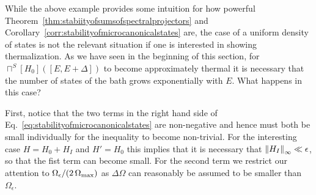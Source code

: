 \documentclass[a4paper,12pt,listof=totoc,index=totoc,bibliography=totoc,headsepline=false,headings=normal,BCOR16.153846mm,DIV12,headinclude,twoside,cleardoublepage=empty,numbers=noenddot,final]{scrreprt}
\theoremstyle{mystyle}
\numberwithin{equation}{section}
\numberwithin{figure}{section}
\numberwithin{lemma}{section}
\numberwithin{theorem}{section}
\numberwithin{corollary}{section}
\numberwithin{definition}{section}
\numberwithin{conjecture}{section}
\numberwithin{observation}{section}
\newcommand{\+}{\mkern2mu}
\newcommand{\texteqref}[1]{Eq.~\eqref{#1}}
\renewcommand{\max}{\mathchoice{\operatorname*{max}}{\operatorname*{max}}{\mathrm{max}}{\mathrm{max}}} %
\renewcommand{\H}{H}
\newcommand{\rhomc}{{\sqcap}}
\newcommand{\norm}[2][]{
  \ifthenelse{\equal{#1}{}}
    {\left\| {#2} \right\|}
    {\ifthenelse{\equal{#1}{uinv}}
      {\left\vert\kern-0.25ex\left\vert\kern-0.25ex\left\vert {#2} \right\vert\kern-0.25ex\right\vert\kern-0.25ex\right\vert}
      {\left\| {#2} \right\|_{#1}}
    }
}
\DeclareMathOperator{\1}{\mathds{1}}
\begin{document}
While the above example provides some intuition for how powerful Theorem~\ref{thm:stabiityofsumsofspectralprojectors} and Corollary~\ref{corr:stabilityofmicrocanonicalstates} are, the case of a uniform density of states is not the relevant situation if one is interested in showing thermalization.
As we have seen in the beginning of this section, for $\rhomc^S[\H_0]([E,E+\Delta])$ to become approximately thermal it is necessary that the number of states of the bath grows exponentially with $E$.
What happens in this case?

First, notice that the two terms in the right hand side of \texteqref{eq:stabilityofmicrocanonicalstates} are non-negative and hence must both be small individually for the inequality to become non-trivial.
For the interesting case $\H = \H_0 + \H_I$ and $\H' = \H_0$ this implies that it is necessary that $\norm[\infty]{\H_I} \ll \epsilon$, so that the fist term can become small.
For the second term we restrict our attention to $\Omega_\epsilon/(2\,\Omega_{\max})$ as $\Delta\Omega$ can reasonably be assumed to be smaller than $\Omega_\epsilon$.
\end{document}
